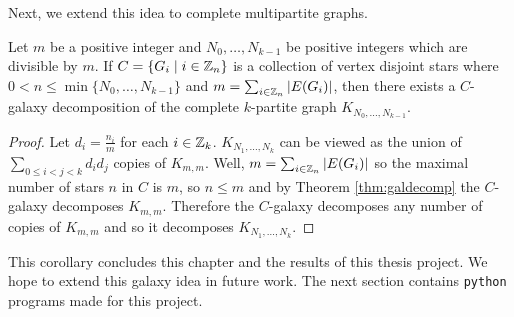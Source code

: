 Next, we extend this idea to complete multipartite graphs.
\begin{corollary}
Let $m$ be a positive integer and $N_{0},\hdots,N_{k-1}$ be positive integers which are divisible by $m$. If $C=\{G_{i}\mid i\in \mathbb{Z}_{n}\}$ is a collection of vertex disjoint stars where $0<n\leq \min\{N_{0},\hdots,N_{k-1}\}$ and $m=\sum_{i\in \mathbb{Z}_{n}} |E(G_{i})|$, then there exists a $C$-galaxy decomposition of the complete $k$-partite graph $K_{N_{0},\hdots,N_{k-1}}$.
\end{corollary}
\begin{proof}
Let $d_{i}=\frac{n_{i}}{m}$ for each $i\in \mathbb{Z}_{k}$. $K_{N_{1},\hdots,N_{k}}$ can be viewed as the union of $\sum\limits_{0\leq i<j<k} d_{i}d_{j}$ copies of $K_{m,m}$. Well, $m=\sum_{i\in \mathbb{Z}_{n}} |E(G_{i})|$ so the maximal number of stars $n$ in $C$ is $m$, so $n\leq m$ and by Theorem \ref{thm:galdecomp} the $C$-galaxy decomposes $K_{m,m}$. Therefore the $C$-galaxy decomposes any number of copies of $K_{m,m}$ and so it decomposes $K_{N_{1},\hdots,N_{k}}$.

\end{proof}
This corollary concludes this chapter and the results of this thesis project. We hope to extend this galaxy idea in future work. The next section contains \verb|python| programs made for this project.